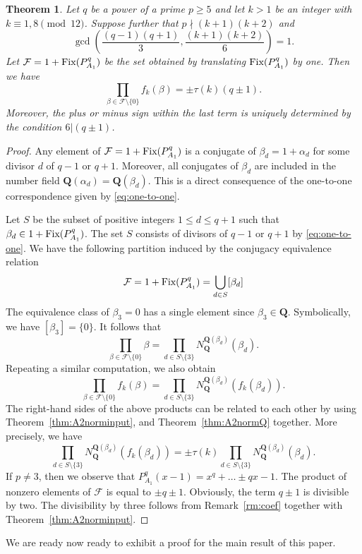 \documentclass{amsart}
\newcommand{\mc}{\mathcal}
\newcommand{\Q}{\mathbf Q}
\newcommand{\Fix}{\textnormal{Fix}}
\numberwithin{equation}{section}
\theoremstyle{plain}
\newtheorem{theorem}{Theorem}
\theoremstyle{definition}
\begin{document}
\begin{theorem}\label{thm:A2outputprod}
Let $q$ be a power of a prime $p\ge 5$ and let $k>1$ be an integer with $k\equiv1,8\pmod{12}$. Suppose further that $p\nmid(k+1)(k+2)$ and
$$\gcd\left(\frac{(q-1)(q+1)}{3}, \frac{(k+1)(k+2)}{6}\right)=1.$$	
Let $\mc{F}=1+\Fix(P_{A_1}^q)$ be the set obtained by translating $\Fix(P_{A_1}^q)$ by one. Then we have
$$
\prod\limits_{\beta\in \mc{F} \setminus\{0\}} f_{k}(\beta)= \pm\tau(k) (q\pm1).
$$
Moreover, the plus or minus sign within the last term is uniquely determined by the condition $6|(q\pm1)$.
\end{theorem}
\begin{proof}
Any element of $\mc{F} = 1+\Fix(P_{A_1}^q)$ is a conjugate of $\beta_d=1+\alpha_d$ for some divisor $d$ of $q-1$ or $q+1$. Moreover, all conjugates of $\beta_d$ are included in the number field $\Q(\alpha_d) = \Q(\beta_d)$. This is a direct consequence of the one-to-one correspondence given by \eqref{eq:one-to-one}. 

Let $S$ be the subset of positive integers $1 \leq d \leq q+1$ such that $\beta_d \in 1+\Fix(P_{A_1}^q)$. The set $S$ consists of divisors of $q-1$ or $q+1$ by \eqref{eq:one-to-one}. We have the following partition induced by the conjugacy equivalence relation 
$$ \mc{F}=1+\Fix(P_{A_1}^q) = \bigcup_{d\in S} [\beta_d]$$
The equivalence class of $\beta_3=0$ has a single element since $\beta_3\in\Q$. Symbolically, we have $[\beta_3] = \{0\}$. It follows that 
$$\prod\limits_{\beta\in \mc{F}\setminus\{0\}}\beta = \prod\limits_{d\in S\setminus\{3\}}  N_{\Q}^{\Q(\beta_d)}\left(\beta_d\right).$$
Repeating a similar computation, we also obtain
$$ \prod\limits_{\beta\in\mc{F}\setminus\{0\}}  f_k(\beta)=\prod\limits_{d\in S\setminus\{3\}}  N_{\Q}^{\Q(\beta_d)}\left(f_k(\beta_d)\right).$$
The right-hand sides of the above products can be related to each other by using Theorem~\ref{thm:A2norminput}, and Theorem~\ref{thm:A2normQ} together. More precisely, we have 
$$\prod\limits_{d\in S\setminus\{3\}}  N_{\Q}^{\Q(\beta_d)}\left(f_k(\beta_d)\right)=\pm\tau(k) \prod\limits_{d\in S\setminus\{3\}} N_{\Q}^{\Q(\beta_d)}\left(\beta_d\right).$$
If $p\neq 3$, then we observe that $P_{A_1}^q(x-1)=x^q+\ldots \pm q x-1$. 
The product of nonzero elements of $\mc{F}$ is equal to $\pm q\pm1$. Obviously, the term $q \pm 1 $ is  divisible by two. The divisibility by three follows from Remark~\ref{rm:coef} together with Theorem~\ref{thm:A2norminput}.
\end{proof}

We are ready now ready to exhibit a proof for the main result of this paper.
\end{document}
